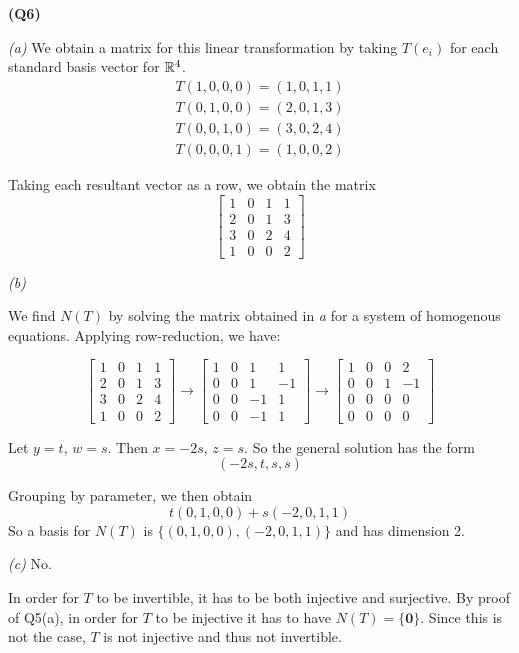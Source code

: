 \documentclass[12pt, a4paper]{article}
\begin{document}
\textbf{(Q6)}

\textit{(a)}
We obtain a matrix for this linear transformation by taking $T(e_i)$
for each standard basis vector for $\mathbb{R}^4$.
\begin{gather*}
    T(1, 0, 0, 0) = (1, 0, 1, 1)\\
    T(0, 1, 0, 0) = (2, 0, 1, 3)\\
    T(0, 0, 1, 0) = (3, 0, 2, 4)\\
    T(0, 0, 0, 1) = (1, 0, 0, 2)
\end{gather*}

Taking each resultant vector as a row, we obtain the matrix
\[
    \begin{bmatrix}
        1 & 0 & 1 & 1\\
        2 & 0 & 1 & 3\\
        3 & 0 & 2 & 4\\
        1 & 0 & 0 & 2
    \end{bmatrix}
\]

\emptyline
\textit{(b)}

We find $N(T)$ by solving the matrix obtained in \textit a for a
system of homogenous equations. Applying row-reduction, we have:

\[
    \begin{bmatrix}
        1 & 0 & 1 & 1\\
        2 & 0 & 1 & 3\\
        3 & 0 & 2 & 4\\
        1 & 0 & 0 & 2
    \end{bmatrix} \to
    \begin{bmatrix}
        1 & 0 & 1 & 1\\
        0 & 0 & 1 & -1\\
        0 & 0 & -1 & 1\\
        0 & 0 & -1 & 1
    \end{bmatrix} \to
    \begin{bmatrix}
        1 & 0 & 0 & 2\\
        0 & 0 & 1 & -1\\
        0 & 0 & 0 & 0\\
        0 & 0 & 0 & 0
    \end{bmatrix}
\]

Let $y = t$, $w = s$. Then $x = -2s$, $z = s$.
So the general solution has the form
\[(-2s, t, s, s)\]

Grouping by parameter, we then obtain
\[
    t(0, 1, 0, 0) + s(-2, 0, 1, 1)
\]
So a basis for $N(T)$ is $\{(0, 1, 0, 0), (-2, 0, 1, 1)\}$
and has dimension 2.

\emptyline
\textit{(c)} No.

In order for $T$ to be invertible, it has to be both injective
and surjective. By proof of Q5(a), in order for $T$ to be injective
it has to have $N(T) = \{\textbf{0}\}$. Since this is not the case,
$T$ is not injective and thus not invertible.
\end{document}
